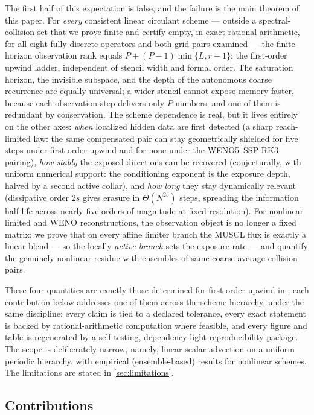 \documentclass[pdflatex,sn-mathphys-num]{sn-jnl}%
\theoremstyle{thmstyleone}%
\theoremstyle{thmstyletwo}%
\theoremstyle{thmstylethree}%
\begin{document}
The first half of this expectation is false, and the failure is the main theorem of this paper.
For \emph{every} consistent linear circulant scheme --- outside a spectral-collision set that we prove finite and certify empty, in exact rational arithmetic, for all eight fully discrete operators and both grid pairs examined --- the finite-horizon observation rank equals $P+(P-1)\min\{L,r-1\}$: the first-order upwind ladder, independent of stencil width and formal order.
The saturation horizon, the invisible subspace, and the depth of the autonomous coarse recurrence are equally universal; a wider stencil cannot expose memory faster, because each observation step delivers only $P$ numbers, and one of them is redundant by conservation.
The scheme dependence is real, but it lives entirely on the other axes: \emph{when} localized hidden data are first detected (a sharp reach-limited law: the same compensated pair can stay geometrically shielded for five steps under first-order upwind and for none under the WENO5--SSP-RK3 pairing), \emph{how stably} the exposed directions can be recovered (conjecturally, with uniform numerical support: the conditioning exponent is the exposure depth, halved by a second active collar), and \emph{how long} they stay dynamically relevant (dissipative order $2s$ gives erasure in $\Theta(N^{2s})$ steps, spreading the information half-life across nearly five orders of magnitude at fixed resolution).
For nonlinear limited and WENO reconstructions, the observation object is no longer a fixed matrix; we prove that on every affine limiter branch the MUSCL flux is exactly a linear blend --- so the locally \emph{active branch} sets the exposure rate --- and quantify the genuinely nonlinear residue with ensembles of same-coarse-average collision pairs.

These four quantities are exactly those determined for first-order upwind in \cite{PolemitisChristakisDrikakis2026FVerasure, PolemitisChristakisDrikakis2026onestep}; each contribution below addresses one of them across the scheme hierarchy, under the same discipline: every claim is tied to a declared tolerance, every exact statement is backed by rational-arithmetic computation where feasible, and every figure and table is regenerated by a self-testing, dependency-light reproducibility package.
The scope is deliberately narrow, namely, linear scalar advection on a uniform periodic hierarchy, with empirical (ensemble-based) results for nonlinear schemes. The limitations are stated in \cref{sec:limitations}.

\subsection{Contributions}\label{sec:contributions}
\end{document}
